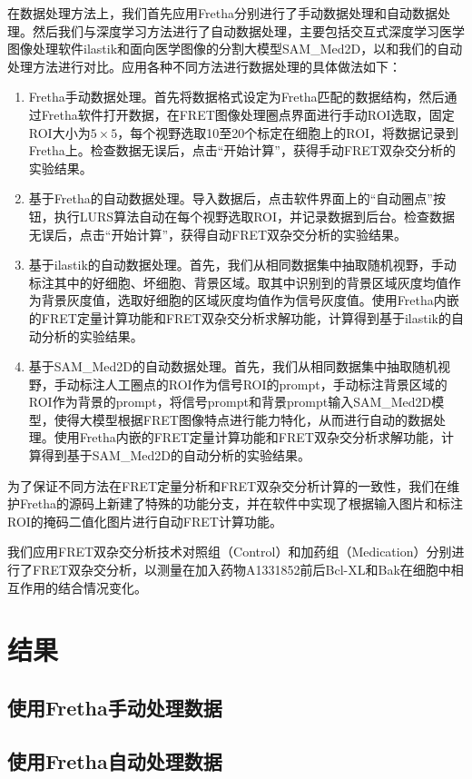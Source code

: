 在数据处理方法上，我们首先应用Fretha分别进行了手动数据处理和自动数据处理。然后我们与深度学习方法进行了自动数据处理，主要包括交互式深度学习医学图像处理软件ilastik和面向医学图像的分割大模型SAM\_Med2D，以和我们的自动处理方法进行对比。应用各种不同方法进行数据处理的具体做法如下：
\begin{enumerate}
    \item Fretha手动数据处理。首先将数据格式设定为Fretha匹配的数据结构，然后通过Fretha软件打开数据，在FRET图像处理圈点界面进行手动ROI选取，固定ROI大小为$5\times 5$，每个视野选取10至20个标定在细胞上的ROI，将数据记录到Fretha上。检查数据无误后，点击“开始计算”，获得手动FRET双杂交分析的实验结果。
    \item 基于Fretha的自动数据处理。导入数据后，点击软件界面上的“自动圈点”按钮，执行LURS算法自动在每个视野选取ROI，并记录数据到后台。检查数据无误后，点击“开始计算”，获得自动FRET双杂交分析的实验结果。
    \item 基于ilastik的自动数据处理。首先，我们从相同数据集中抽取随机视野，手动标注其中的好细胞、坏细胞、背景区域。取其中识别到的背景区域灰度均值作为背景灰度值，选取好细胞的区域灰度均值作为信号灰度值。使用Fretha内嵌的FRET定量计算功能和FRET双杂交分析求解功能，计算得到基于ilastik的自动分析的实验结果。
    \item 基于SAM\_Med2D的自动数据处理。首先，我们从相同数据集中抽取随机视野，手动标注人工圈点的ROI作为信号ROI的prompt，手动标注背景区域的ROI作为背景的prompt，将信号prompt和背景prompt输入SAM\_Med2D模型，使得大模型根据FRET图像特点进行能力特化，从而进行自动的数据处理。使用Fretha内嵌的FRET定量计算功能和FRET双杂交分析求解功能，计算得到基于SAM\_Med2D的自动分析的实验结果。
\end{enumerate}
为了保证不同方法在FRET定量分析和FRET双杂交分析计算的一致性，我们在维护Fretha的源码上新建了特殊的功能分支，并在软件中实现了根据输入图片和标注ROI的掩码二值化图片进行自动FRET计算功能。

我们应用FRET双杂交分析技术对照组（Control）和加药组（Medication）分别进行了FRET双杂交分析，以测量在加入药物A1331852前后Bcl-XL和Bak在细胞中相互作用的结合情况变化。

\section{结果}

\subsection{使用Fretha手动处理数据}

\subsection{使用Fretha自动处理数据}


